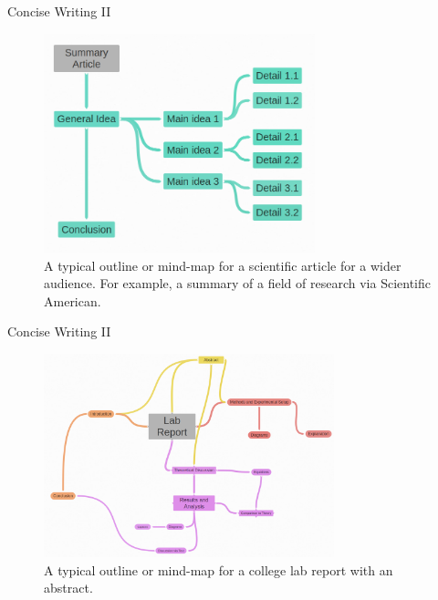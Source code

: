 \documentclass{beamer}
\begin{document}
\begin{frame}{Concise Writing II}
\begin{figure}
\centering
\includegraphics[width=0.7\textwidth]{figures/MindMap1.png}
\caption{\label{fig:mm1} A typical outline or mind-map for a scientific article for a wider audience.  For example, a summary of a field of research via Scientific American.}
\end{figure}
\end{frame}

\begin{frame}{Concise Writing II}
\begin{figure}
\centering
\includegraphics[width=0.75\textwidth]{figures/MindMap2.png}
\caption{\label{fig:mm2} A typical outline or mind-map for a college lab report with an abstract.}
\end{figure}
\end{frame}
\end{document}

